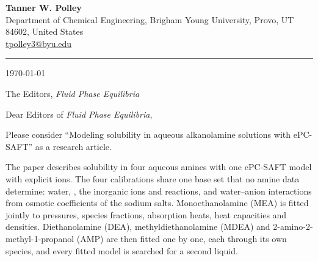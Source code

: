 \documentclass[11pt]{article}
\begin{document}
\begin{center}
{\large\textbf{Tanner W. Polley}}\\[2pt]
Department of Chemical Engineering, Brigham Young University, Provo, UT 84602, United States\\
\href{mailto:tpolley3@byu.edu}{tpolley3@byu.edu}
\end{center}
\vspace{-0.6\baselineskip}
\rule{\linewidth}{0.4pt}

\today

The Editors, \textit{Fluid Phase Equilibria}

Dear Editors of \textit{Fluid Phase Equilibria},

Please consider ``Modeling \COtwo solubility in aqueous alkanolamine solutions with ePC-SAFT'' as a research article.

The paper describes \COtwo solubility in four aqueous amines with one ePC-SAFT model with explicit ions.
The four calibrations share one base set that no amine data determine: water, \COtwo, the inorganic ions and reactions, and water--anion interactions from osmotic coefficients of the sodium salts.
Monoethanolamine (MEA) is fitted jointly to pressures, species fractions, absorption heats, heat capacities and densities.
Diethanolamine (DEA), methyldiethanolamine (MDEA) and 2-amino-2-methyl-1-propanol (AMP) are then fitted one by one, each through its own species, and every fitted model is searched for a second liquid.
\end{document}
